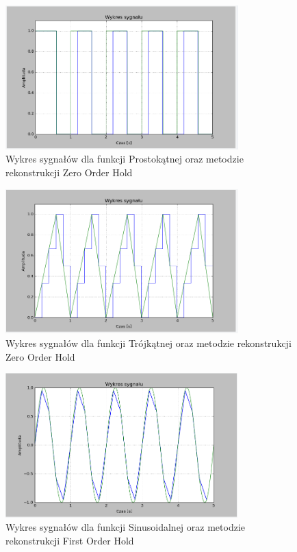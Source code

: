 \documentclass{article}
\begin{document}
    \begin{figure}[h!]
        \centering
        \includegraphics[width=0.8\textwidth]{img/1/zoh_rec.png}
        \caption{Wykres sygnałów dla funkcji Prostokątnej oraz metodzie rekonstrukcji Zero Order Hold}
    \end{figure}
    \FloatBarrier

    \begin{figure}[h!]
        \centering
        \includegraphics[width=0.8\textwidth]{img/1/zoh_tri.png}
        \caption{Wykres sygnałów dla funkcji Trójkątnej oraz metodzie rekonstrukcji Zero Order Hold}
    \end{figure}
    \FloatBarrier

    \begin{figure}[h!]
        \centering
        \includegraphics[width=0.8\textwidth]{img/1/foh5.png}
        \caption{Wykres sygnałów dla funkcji Sinusoidalnej oraz metodzie rekonstrukcji First Order Hold}
    \end{figure}
    \FloatBarrier
\end{document}
